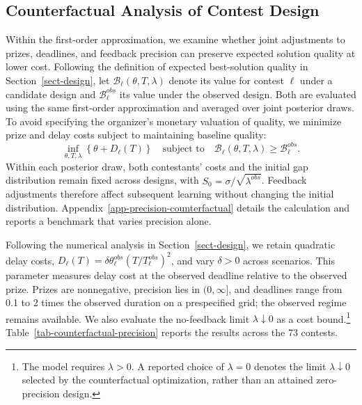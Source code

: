 \documentclass[mnsc]{informs3}
\begin{document}
\subsection{Counterfactual Analysis of Contest Design}\label{sect-precision-design}

Within the first-order approximation, we examine whether joint adjustments to prizes, deadlines, and feedback precision can preserve expected solution quality at lower cost. Following the definition of expected best-solution quality in Section~\ref{sect-design}, let $\mathcal B_\ell(\theta,T,\lambda)$ denote its value for contest $\ell$ under a candidate design and $\mathcal B_\ell^{obs}$ its value under the observed design. Both are evaluated using the same first-order approximation and averaged over joint posterior draws. To avoid specifying the organizer's monetary valuation of quality, we minimize prize and delay costs subject to maintaining baseline quality:
\begin{equation}\label{eq-empirical-joint-design}
\inf_{\theta,T,\lambda}\left\{\theta+D_\ell(T)\right\}
\quad\text{subject to}\quad
\mathcal B_\ell(\theta,T,\lambda)\geq \mathcal B_\ell^{obs}.
\end{equation}
Within each posterior draw, both contestants' costs and the initial gap distribution remain fixed across designs, with $S_0=\sigma/\sqrt{\lambda^{obs}}$. Feedback adjustments therefore affect subsequent learning without changing the initial distribution. Appendix~\ref{app-precision-counterfactual} details the calculation and reports a benchmark that varies precision alone.

Following the numerical analysis in Section~\ref{sect-design}, we retain quadratic delay costs, $D_\ell(T)=\delta\theta_\ell^{obs}(T/T_\ell^{obs})^2$, and vary $\delta>0$ across scenarios. This parameter measures delay cost at the observed deadline relative to the observed prize. Prizes are nonnegative, precision lies in $(0,\infty]$, and deadlines range from 0.1 to 2 times the observed duration on a prespecified grid; the observed regime remains available. We also evaluate the no-feedback limit $\lambda\downarrow0$ as a cost bound.\footnote{The model requires $\lambda>0$. A reported choice of $\lambda=0$ denotes the limit $\lambda\downarrow0$ selected by the counterfactual optimization, rather than an attained zero-precision design.} Table~\ref{tab-counterfactual-precision} reports the results across the 73 contests.
\end{document}

